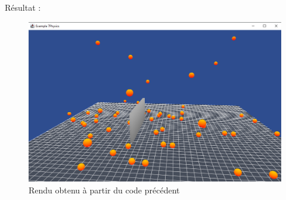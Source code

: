 \documentclass[11pt]{report}
\begin{document}
Résultat :

\begin{figure}[h]
  \centering
  \includegraphics{./example.png}
  \caption{Rendu obtenu à partir du code précédent}
\end{figure}
\end{document}
